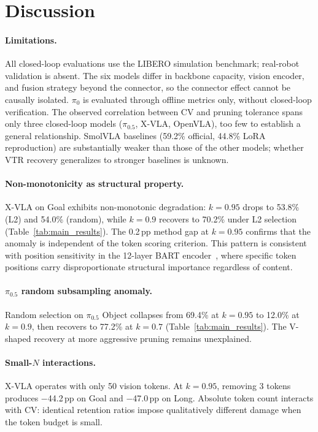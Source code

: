 \section{Discussion}
\label{sec:discussion}

\paragraph{Limitations.}
All closed-loop evaluations use the LIBERO simulation benchmark; real-robot validation is absent. The six models differ in backbone capacity, vision encoder, and fusion strategy beyond the connector, so the connector effect cannot be causally isolated. $\pi_0$ is evaluated through offline metrics only, without closed-loop verification. The observed correlation between CV and pruning tolerance spans only three closed-loop models ($\pi_0.5$, X-VLA, OpenVLA), too few to establish a general relationship. SmolVLA baselines (59.2\% official, 44.8\% LoRA reproduction) are substantially weaker than those of the other models; whether VTR recovery generalizes to stronger baselines is unknown.

\paragraph{Non-monotonicity as structural property.}
X-VLA on Goal exhibits non-monotonic degradation: $k{=}0.95$ drops to 53.8\% (L2) and 54.0\% (random), while $k{=}0.9$ recovers to 70.2\% under L2 selection (Table~\ref{tab:main_results}). The 0.2\,pp method gap at $k{=}0.95$ confirms that the anomaly is independent of the token scoring criterion. This pattern is consistent with position sensitivity in the 12-layer BART encoder~\cite{lewis2020bart}, where specific token positions carry disproportionate structural importance regardless of content.

\paragraph{$\pi_0.5$ random subsampling anomaly.}
Random selection on $\pi_0.5$ Object collapses from 69.4\% at $k{=}0.95$ to 12.0\% at $k{=}0.9$, then recovers to 77.2\% at $k{=}0.7$ (Table~\ref{tab:main_results}). The V-shaped recovery at more aggressive pruning remains unexplained.

\paragraph{Small-$N$ interactions.}
X-VLA operates with only 50 vision tokens. At $k{=}0.95$, removing 3 tokens produces $-$44.2\,pp on Goal and $-$47.0\,pp on Long. Absolute token count interacts with CV: identical retention ratios impose qualitatively different damage when the token budget is small.

